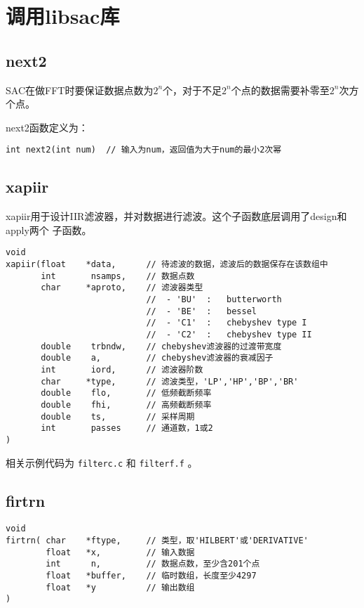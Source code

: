 \section{调用libsac库}
\label{sec:libsac}
\subsection{next2}
SAC在做FFT时要保证数据点数为$2^n$个，对于不足$2^n$个点的数据需要补零至$2^n$次方个点。

next2函数定义为：
\begin{verbatim}
int next2(int num)  // 输入为num，返回值为大于num的最小2次幂
\end{verbatim}

\subsection{xapiir}
xapiir用于设计IIR滤波器，并对数据进行滤波。这个子函数底层调用了design和apply两个
子函数。
\begin{verbatim}
void
xapiir(float    *data,      // 待滤波的数据，滤波后的数据保存在该数组中
       int       nsamps,    // 数据点数
       char     *aproto,    // 滤波器类型
                            //  - 'BU'  :   butterworth
                            //  - 'BE'  :   bessel
                            //  - 'C1'  :   chebyshev type I
                            //  - 'C2'  :   chebyshev type II
       double    trbndw,    // chebyshev滤波器的过渡带宽度
       double    a,         // chebyshev滤波器的衰减因子
       int       iord,      // 滤波器阶数
       char     *type,      // 滤波类型，'LP','HP','BP','BR'
       double    flo,       // 低频截断频率
       double    fhi,       // 高频截断频率
       double    ts,        // 采样周期
       int       passes     // 通道数，1或2
)
\end{verbatim}

相关示例代码为 \texttt{filterc.c} 和 \texttt{filterf.f} 。

\subsection{firtrn}
\begin{verbatim}
void
firtrn( char    *ftype,     // 类型，取'HILBERT'或'DERIVATIVE'
        float   *x,         // 输入数据
        int      n,         // 数据点数，至少含201个点
        float   *buffer,    // 临时数组，长度至少4297
        float   *y          // 输出数组
)
\end{verbatim}

